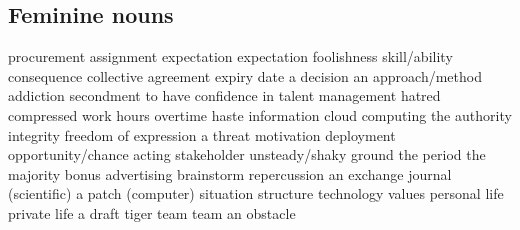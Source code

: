 \subsection*{Feminine nouns}
   {procurement}
   {assignment}
   {expectation}
   {expectation}
   {foolishness}
   {skill/ability}
   {consequence}
   {collective agreement}
   {expiry date}
   {a decision}
   {an approach/method}
   {addiction}
   {secondment}
   {to have confidence in}
   {talent management}
   {hatred}
   {compressed work hours}
   {overtime}
   {haste}
   {information}
   {cloud computing}
   {the authority}
   {integrity}
   {freedom of expression}
   {a threat}
   {motivation}
   {deployment}
   {opportunity/chance}
   {acting}
   {stakeholder}
   {unsteady/shaky ground}
   {the period}
   {the majority}
   {bonus}
   {advertising}
   {brainstorm}
   {repercussion}
   {an exchange}
   {journal (scientific)}
   {a patch (computer)}
   {situation}
   {structure}
   {technology}
   {values}
   {personal life}
   {private life}
   {a draft}
   {tiger team}
   {team}
   {an obstacle}
